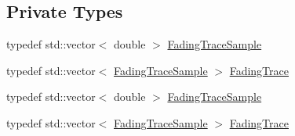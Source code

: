 \subsection*{Private Types}
\begin{DoxyCompactItemize}
\item 
typedef std\+::vector$<$ double $>$ \hyperlink{classns3_1_1TraceFadingLossModel_a7bedaeca55a257cd42f07e348cdec2eb}{Fading\+Trace\+Sample}
\item 
typedef std\+::vector$<$ \hyperlink{classns3_1_1TraceFadingLossModel_a7bedaeca55a257cd42f07e348cdec2eb}{Fading\+Trace\+Sample} $>$ \hyperlink{classns3_1_1TraceFadingLossModel_a909ee0cf2f74bc9914ac283e0ff2eb15}{Fading\+Trace}
\item 
typedef std\+::vector$<$ double $>$ \hyperlink{classns3_1_1TraceFadingLossModel_a7bedaeca55a257cd42f07e348cdec2eb}{Fading\+Trace\+Sample}
\item 
typedef std\+::vector$<$ \hyperlink{classns3_1_1TraceFadingLossModel_a7bedaeca55a257cd42f07e348cdec2eb}{Fading\+Trace\+Sample} $>$ \hyperlink{classns3_1_1TraceFadingLossModel_a909ee0cf2f74bc9914ac283e0ff2eb15}{Fading\+Trace}
\end{DoxyCompactItemize}
